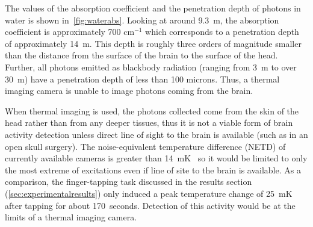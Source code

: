 The values of the absorption coefficient and the penetration depth of photons in water is shown in~\cref{fig:waterabs}. Looking at around 9.3~\textmu m, the absorption coefficient is approximately 700 cm$^{-1}$ which corresponds to a penetration depth of approximately 14~\textmu m.  This depth is roughly three orders of magnitude smaller than the distance from the surface of the brain to the surface of the head.  Further, all photons emitted as blackbody radiation (ranging from 3~\textmu m to over 30~\textmu m) have a penetration depth of less than 100 microns.  Thus, a thermal imaging camera is unable to image photons coming from the brain.

When thermal imaging is used, the photons collected come from the skin of the head rather than from any deeper tissues, thus it is not a viable form of brain activity detection unless direct line of sight to the brain is available (such as in an open skull surgery).  The noise-equivalent temperature difference (NETD) of currently available cameras is greater than 14~mK~\citep{flir,ici} so it would be limited to only the most extreme of excitations even if line of site to the brain is available.  As a comparison, the finger-tapping task discussed in the results section (\cref{sec:experimentalresults}) only induced a peak temperature change of 25~mK after tapping for about 170~seconds.  Detection of this activity would be at the limits of a thermal imaging camera.

